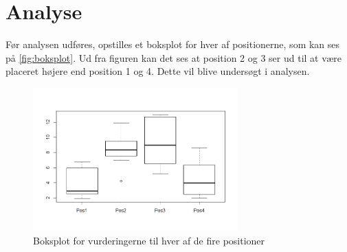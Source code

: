 \section*{Analyse}
\label{Analyse}
%
Før analysen udføres, opstilles et boksplot for hver af positionerne, som kan ses på \autoref{fig:boksplot}. Ud fra figuren kan det ses at position 2 og 3 ser ud til at være placeret højere end position 1 og 4. Dette vil blive undersøgt i analysen.

\begin{figure}[H]
\centering
\includegraphics[width = 0.7\textwidth]{Figure/Rplot.png} 
\caption{Boksplot for vurderingerne til hver af de fire positioner}
\label{fig:boksplot}
\end{figure}

